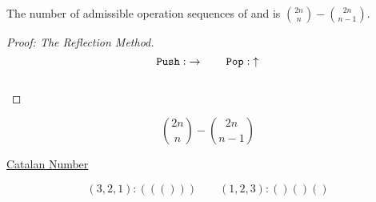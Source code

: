 \begin{frame}{}
  \begin{theorem}
    The number of admissible operation sequences of \texttt{\it {}} and \texttt{\it {}} is ${2n \choose n} - {2n \choose n-1}$.
  \end{theorem}

  \pause
  \begin{proof}[Proof: The Reflection Method]
    \[
      \texttt{Push}{}: \;\rightarrow \qquad \texttt{Pop}{}: \;\uparrow
    \]

    \begin{columns}
      \pause
	\begin{center}
	  \resizebox{0.80\textwidth}{!}{}
	\end{center}
    \end{columns}
  \end{proof}
\end{frame}

\begin{frame}{}
  \begin{center}
    \resizebox{0.60\textwidth}{!}{}
  \end{center}
\end{frame}


\begin{frame}{}
  \[
    {2n \choose n} - {2n \choose n-1}
  \]

  \begin{center}
    {\Large \href{https://en.wikipedia.org/wiki/Catalan\_number}{Catalan Number}}
  \end{center}

  \[
    (3,2,1): ((())) \qquad (1,2,3): ()()()
  \]
\end{frame}
